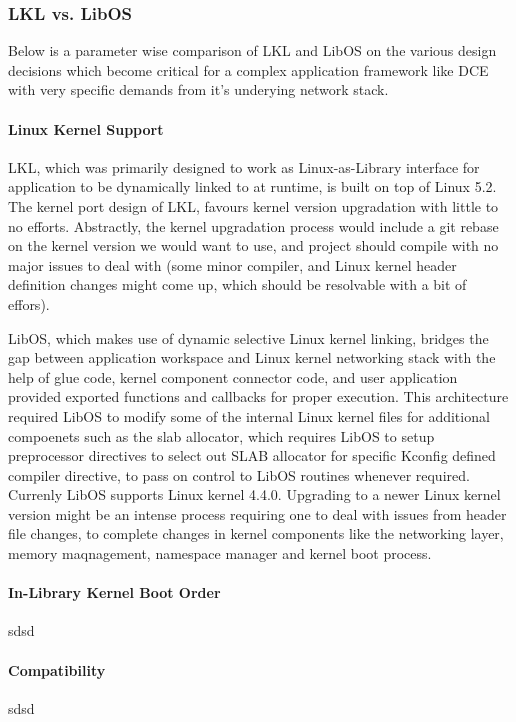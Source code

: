 \documentclass{sig-alternate}
\begin{document}
\subsubsection{LKL vs. LibOS}
Below is a parameter wise comparison of LKL and LibOS on the various design decisions which become critical for a complex application framework like 
DCE with very specific demands from it's underying network stack.

\paragraph{Linux Kernel Support}
LKL, which was primarily designed to work as Linux-as-Library interface for application to be dynamically linked to at runtime, is built on top of 
Linux 5.2. The kernel port design of LKL, favours kernel version upgradation with little to no efforts. Abstractly, the kernel upgradation process 
would include a git rebase on the kernel version we would want to use, and project should compile with no major issues to deal with (some minor compiler, 
and Linux kernel header definition changes might come up, which should be resolvable with a bit of effors).

LibOS, which makes use of dynamic selective Linux kernel linking, bridges the gap between application workspace and Linux kernel networking stack with
the help of glue code, kernel component connector code, and user application provided exported functions and callbacks for proper execution. This
architecture required LibOS to modify some of the internal Linux kernel files for additional compoenets such as the slab allocator, which requires 
LibOS to setup preprocessor directives to select out SLAB allocator for specific Kconfig defined compiler directive, to pass on control to LibOS routines 
whenever required. Currenly LibOS supports Linux kernel 4.4.0. Upgrading to a newer Linux kernel version might be an intense process requiring one 
to deal with issues from header file changes, to complete changes in kernel components like the networking layer, memory maqnagement, namespace manager 
and kernel boot process.


\paragraph{In-Library Kernel Boot Order}
sdsd
\paragraph{Compatibility}
sdsd
\end{document}
